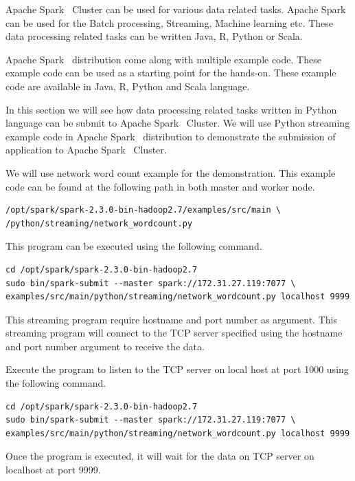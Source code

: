 Apache Spark~\cite{hid-sp18-511-www-spark} Cluster can be used for various data related tasks.
Apache Spark~\cite{hid-sp18-511-www-spark} can be used for the Batch processing, Streaming, Machine learning etc. These data processing related tasks can be written Java, R, Python or Scala. 

Apache Spark~\cite{hid-sp18-511-www-spark} distribution come along with multiple example code. These example code can be used as a starting point for the hands-on. These example code are available in Java, R, Python and Scala language. 

In this section we will see how data processing related tasks written in Python language can be submit to Apache Spark~\cite{hid-sp18-511-www-spark} Cluster. We will use Python streaming example code in Apache Spark~\cite{hid-sp18-511-www-spark} distribution to demonstrate the submission of application to Apache Spark~\cite{hid-sp18-511-www-spark} Cluster.

We will use network word count example for the demonstration. This example code can be found at the following path in both master and worker node.

\begin{verbatim}
/opt/spark/spark-2.3.0-bin-hadoop2.7/examples/src/main \
/python/streaming/network_wordcount.py
\end{verbatim}

This program can be executed using the following command.

\begin{verbatim}
cd /opt/spark/spark-2.3.0-bin-hadoop2.7
sudo bin/spark-submit --master spark://172.31.27.119:7077 \
examples/src/main/python/streaming/network_wordcount.py localhost 9999
\end{verbatim}

This streaming program require hostname and port number as argument. This streaming program will connect to the TCP server specified using the hostname and port number argument to receive the data.

Execute the program to listen to the TCP server on local host at port 1000 using the following command.

\begin{verbatim}
cd /opt/spark/spark-2.3.0-bin-hadoop2.7
sudo bin/spark-submit --master spark://172.31.27.119:7077 \
examples/src/main/python/streaming/network_wordcount.py localhost 9999 
\end{verbatim}

Once the program is executed, it will wait for the data on TCP server on localhost at port 9999.

